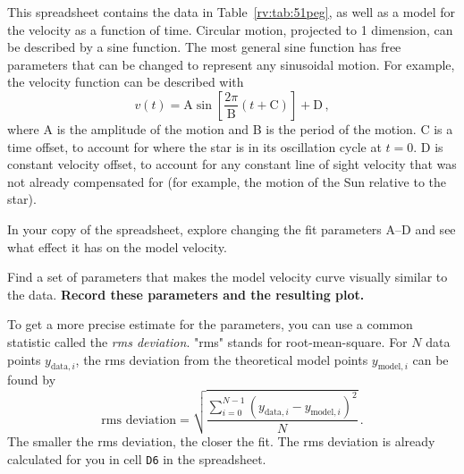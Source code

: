 This spreadsheet contains the data in Table~\ref{rv:tab:51peg}, as well as a model for the velocity as a function of time. Circular motion, projected to 1 dimension, can be described by a sine function. The most general sine function has free parameters that can be changed to represent any sinusoidal motion. For example, the velocity function can be described with
\begin{equation}
 v(t) = \textrm{A} \sin \left[\frac{2 \pi}{\textrm{B}}\left(t + \textrm{C}\right)\right] + \textrm{D} \,,
\end{equation}
where A is the amplitude of the motion and B is the period of the motion. C is a time offset, to account for where the star is in its oscillation cycle at $t=0$. D is constant velocity offset, to account for any constant line of sight velocity that was not already compensated for (for example, the motion of the Sun relative to the star).


%

\begin{steps}
	\item In your copy of the spreadsheet, explore changing the fit parameters A--D and see what effect it has on the model velocity.
	
	\item Find a set of parameters that makes the model velocity curve visually similar to the data. \textbf{Record these parameters and the resulting plot.}
\end{steps}

To get a more precise estimate for the parameters, you can use a common statistic called the \textit{rms deviation}. "rms" stands for root-mean-square. For $N$ data points $y_{\textrm{data},i}$, the rms deviation from the theoretical model points $y_{\textrm{model},i}$ can be found by
\begin{equation}
 \textrm{rms deviation} = \sqrt{\dfrac{\sum_{i=0}^{N-1} \left( y_{\textrm{data},i} - y_{\textrm{model},i} \right)^2}{N}} \,.
\end{equation}
The smaller the rms deviation, the closer the fit. The rms deviation is already calculated for you in cell \texttt{D6} in the spreadsheet.

